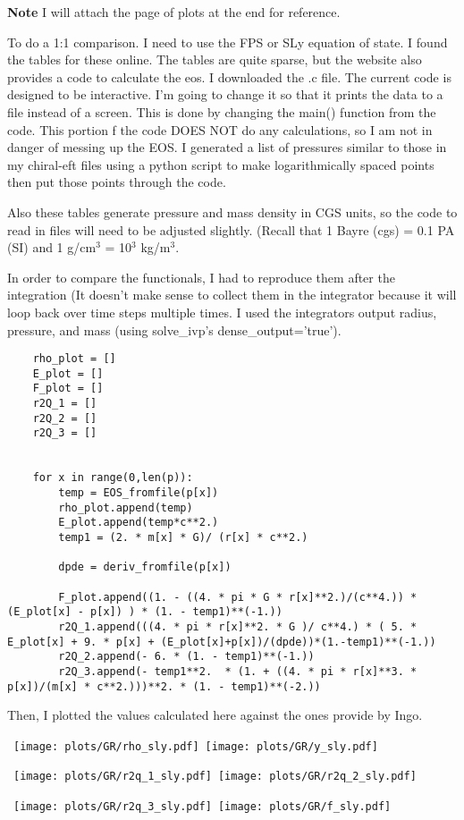 \documentclass[11pt]{article}
\numberwithin{equation}{section}
\begin{document}
\textbf{Note} I will attach the page of plots at the end for reference.  


To do a 1:1 comparison. I need to use the FPS or SLy equation of state.  I found the tables for these online.  The tables are quite sparse, but the website also provides a code to calculate the eos.  I downloaded the .c file.  The current code is designed to be interactive.  I'm going to change it so that it prints the data to a file instead of a screen.  This is done by changing the main() function from the code.  This portion f the code DOES NOT do any calculations, so I am not in danger of messing up the EOS.  I generated a list of pressures similar to those in my chiral-eft files using a python script to make logarithmically spaced points then put those points through the code.  

Also these tables generate pressure and mass density in CGS units, so the code to read in files will need to be adjusted slightly.  (Recall that 1 Bayre (cgs) = 0.1 PA (SI) and 1 g/cm$^3$ = 10$^3$ kg/m$^3$.  

In order to compare the functionals, I had to reproduce them after the integration (It doesn't make sense to collect them in the integrator because it will loop back over time steps multiple times.   I used the integrators output radius, pressure, and mass (using solve\_ivp's dense\_output='true').

\begin{lstlisting}
    rho_plot = []
    E_plot = []
    F_plot = []
    r2Q_1 = []
    r2Q_2 = []
    r2Q_3 = []


    for x in range(0,len(p)):
        temp = EOS_fromfile(p[x])
        rho_plot.append(temp)
        E_plot.append(temp*c**2.)
        temp1 = (2. * m[x] * G)/ (r[x] * c**2.)

        dpde = deriv_fromfile(p[x])

        F_plot.append((1. - ((4. * pi * G * r[x]**2.)/(c**4.)) * (E_plot[x] - p[x]) ) * (1. - temp1)**(-1.))
        r2Q_1.append(((4. * pi * r[x]**2. * G )/ c**4.) * ( 5. * E_plot[x] + 9. * p[x] + (E_plot[x]+p[x])/(dpde))*(1.-temp1)**(-1.)) 
        r2Q_2.append(- 6. * (1. - temp1)**(-1.))
        r2Q_3.append(- temp1**2.  * (1. + ((4. * pi * r[x]**3. * p[x])/(m[x] * c**2.)))**2. * (1. - temp1)**(-2.))
\end{lstlisting}


Then, I plotted the values calculated here against the ones provide by Ingo.

\begin{center}
\hbox{
\texttt{[image: plots/GR/rho\_sly.pdf]}
\texttt{[image: plots/GR/y\_sly.pdf]}}
\end{center}
\begin{center}
\hbox{
\texttt{[image: plots/GR/r2q\_1\_sly.pdf]}
\texttt{[image: plots/GR/r2q\_2\_sly.pdf]}}
\end{center}
\begin{center}
\hbox{
\texttt{[image: plots/GR/r2q\_3\_sly.pdf]}
\texttt{[image: plots/GR/f\_sly.pdf]}}
\end{center}
\end{document}
